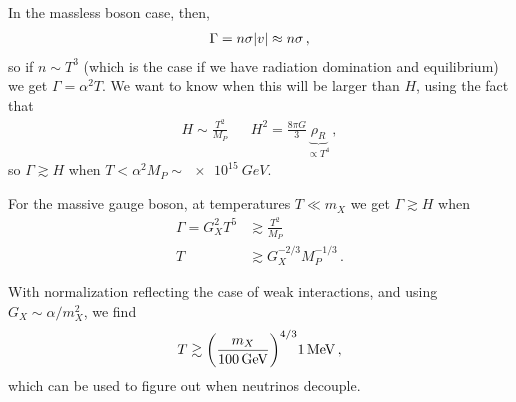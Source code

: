 \documentclass[main.tex]{subfiles}
\begin{document}
In the massless boson case, then, 
%
\begin{align}
\Gamma = n \sigma \abs{v} \approx n \sigma 
\,,
\end{align}
%
so if \(n \sim T^3\) (which is the case if we have radiation domination and equilibrium) we get \(\Gamma = \alpha^2 T\). We want to know when this will be larger than \(H\), using the fact that 
%
\begin{align}
H \sim \frac{T^2}{M_P} && H^2 = \frac{8 \pi G}{3} \underbrace{\rho _R}_{\propto T^{4}}
\,,
\end{align}
%
so \(\Gamma \gtrsim H\) when \(T < \alpha^2 M_P \sim \SI{e15}{GeV}\). 

For the massive gauge boson, at temperatures \(T \ll m_X\) we get \(\Gamma \gtrsim H\) when 
%
\begin{align}
\Gamma = G_X^2 T^{5} &\gtrsim \frac{T^2}{M_P}  \\
T &\gtrsim G_X^{-2/3} M_P^{-1/3}
\,.
\end{align}

With normalization reflecting the case of weak interactions, and using \(G_X \sim \alpha / m_X^2\), we find 
%
\begin{align}
T \gtrsim \qty(\frac{m_X}{\SI{100}{GeV}})^{4/3} \SI{1}{MeV}
\,,
\end{align}
%
which can be used to figure out when neutrinos decouple. 
\end{document}
